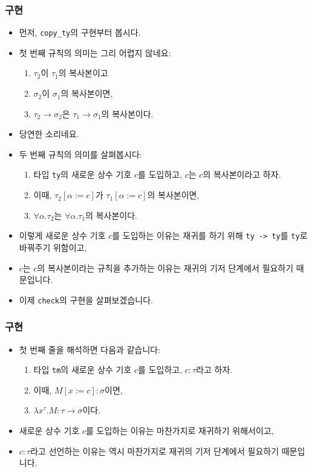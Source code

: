 \documentclass[slidestop,compress,mathserif]{beamer}
\begin{document}
    \begin{frame}
        \frametitle{구현}
        \begin{itemize}[<+->]
            \item 먼저, \texttt{copy\_ty}의 구현부터 봅시다.
            \item 첫 번째 규칙의 의미는 그리 어렵지 않네요:
            \begin{enumerate}
                \item $\tau_2$이 $\tau_1$의 복사본이고
                \item $\sigma_2$이 $\sigma_1$의 복사본이면,
                \item $\tau_2 \to \sigma_2$은 $\tau_1 \to \sigma_1$의 복사본이다.
            \end{enumerate}
            \item 당연한 소리네요.
            \item 두 번째 규칙의 의미를 살펴봅시다:
            \begin{enumerate}
                \item 타입 \texttt{ty}의 새로운 상수 기호 $c$를 도입하고, $c$는 $c$의 복사본이라고 하자.
                \item 이때, $\tau_2 \left[ \alpha := c \right]$가 $\tau_1 \left[ \alpha := c \right]$의 복사본이면,
                \item $\forall \alpha . \tau_2$는 $\forall \alpha . \tau_1$의 복사본이다.
            \end{enumerate}
            \item 이렇게 새로운 상수 기호 $c$를 도입하는 이유는 재귀를 하기 위해 \texttt{ty -> ty}를 \texttt{ty}로 바꿔주기 위함이고,
            \item $c$는 $c$의 복사본이라는 규칙을 추가하는 이유는 재귀의 기저 단계에서 필요하기 때문입니다.
            \item 이제 \texttt{check}의 구현을 살펴보겠습니다.
        \end{itemize}
    \end{frame}

    \begin{frame}
        \frametitle{구현}
        \begin{itemize}
            \item 첫 번째 줄을 해석하면 다음과 같습니다:
            \begin{enumerate}
                \item 타입 \texttt{tm}의 새로운 상수 기호 $c$를 도입하고, $c : \tau$라고 하자.
                \item 이때, $M \left[ x := c \right] : \sigma$이면,
                \item $\lambda x^{\tau} . M : \tau \to \sigma$이다.
            \end{enumerate}
            \item 새로운 상수 기호 $c$를 도입하는 이유는 마찬가지로 재귀하기 위해서이고,
            \item $c : \tau$라고 선언하는 이유는 역시 마찬가지로 재귀의 기저 단계에서 필요하기 때문입니다.
        \end{itemize}
    \end{frame}
\end{document}

